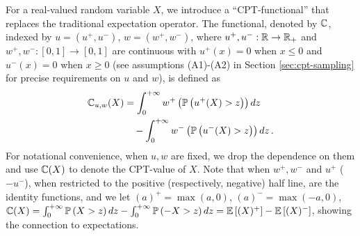 
For a real-valued random variable $X$, we introduce a ``CPT-functional'' that replaces the traditional expectation operator. 
The functional, denoted by $\mathbb{C}$,
indexed by
$u=(u^+,u^-)$, $w=(w^+,w^-)$, where $u^+,u^-:\mathbb{R}\rightarrow \mathbb{R}_+$ and $w^+,w^-:[0,1] \rightarrow [0,1]$ are continuous
with $u^+(x)=0$ when $x\le 0$ and $u^-(x)=0$ when $x\ge 0$ (see assumptions (A1)-(A2) in Section \ref{sec:cpt-sampling} for precise requirements on $u$ and $w$),
 is defined as 
\begin{align}
\mathbb{C}_{u,w}(X) &= \int_0^{+\infty} w^+\left(\mathbb{P}\left( u^+(X)>z \right)\right) dz\nonumber \\
&\quad - \int_0^{+\infty} w^-\left(\mathbb{P}\left( u^-(X)>z \right)\right) dz\,. \label{eq:cpt-general}
\end{align}
For notational convenience, when $u,w$ are fixed, we drop the dependence on them and use $\mathbb{C}(X)$ to denote the CPT-value of $X$. Note that when $w^+,w^-$
and $u^+$ ($-u^-$), when restricted to the positive (respectively, negative) half line, 
are the identity functions, and we let $(a)^+ = \max(a,0)$, $(a)^- = \max(-a,0)$,
$\mathbb{C}(X) = \int_0^{+\infty} \mathbb{P}\left( X>z \right) dz -  \int_0^{+\infty} \mathbb{P}\left( -X>z \right) dz = \mathbb{E}\left[ (X)^+ \right] - \mathbb{E}\left[ (X)^- \right]$, showing the connection to expectations.

